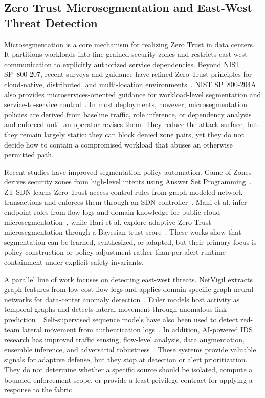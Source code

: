 \documentclass[final,5p]{elsarticle}
\begin{document}
\subsection{Zero Trust Microsegmentation and East-West Threat Detection}
\label{sec:rw_microseg}

Microsegmentation is a core mechanism for realizing Zero Trust in data centers. It partitions workloads into fine-grained security zones and restricts east-west communication to explicitly authorized service dependencies. Beyond NIST SP~800-207, recent surveys and guidance have refined Zero Trust principles for cloud-native, distributed, and multi-location environments~\cite{rose2020zerotrust,buck2021nevertrust,syed2022ztasurvey,chandramouli2023zta207a}. NIST SP~800-204A also provides microservices-oriented guidance for workload-level segmentation and service-to-service control~\cite{chandramouli2020sp800204a}. In most deployments, however, microsegmentation policies are derived from baseline traffic, role inference, or dependency analysis and enforced until an operator revises them. They reduce the attack surface, but they remain largely static: they can block denied zone pairs, yet they do not decide how to contain a compromised workload that abuses an otherwise permitted path.

Recent studies have improved segmentation policy automation. Game of Zones derives security zones from high-level intents using Answer Set Programming~\cite{canavese2025gameofzones}. ZT-SDN learns Zero Trust access-control rules from graph-modeled network transactions and enforces them through an SDN controller~\cite{katsis2025ztsdn}. Mani et al. infer endpoint roles from flow logs and domain knowledge for public-cloud microsegmentation~\cite{mani2025rolebased}, while Hari et al. explore adaptive Zero Trust microsegmentation through a Bayesian trust score~\cite{hari2026threetier}. These works show that segmentation can be learned, synthesized, or adapted, but their primary focus is policy construction or policy adjustment rather than per-alert runtime containment under explicit safety invariants.

A parallel line of work focuses on detecting east-west threats. NetVigil extracts graph features from low-cost flow logs and applies domain-specific graph neural networks for data-center anomaly detection~\cite{netvigil}. Euler models host activity as temporal graphs and detects lateral movement through anomalous link prediction~\cite{king2022euler}. Self-supervised sequence models have also been used to detect red-team lateral movement from authentication logs~\cite{gokstorp2024anomaly}. In addition, AI-powered IDS research has improved traffic sensing, flow-level analysis, data augmentation, ensemble inference, and adversarial robustness~\cite{cSDAID22,jSAID23,jAPELID24}. These systems provide valuable signals for adaptive defense, but they stop at detection or alert prioritization. They do not determine whether a specific source should be isolated, compute a bounded enforcement scope, or provide a least-privilege contract for applying a response to the fabric.
\end{document}
